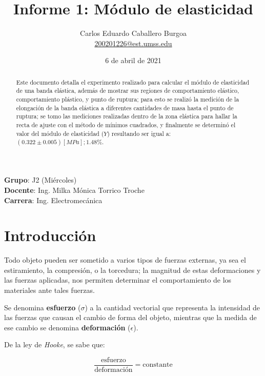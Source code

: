 \documentclass[letter,11pt]{article}
\title{Informe 1: Módulo de elasticidad}
\author{Carlos Eduardo Caballero Burgoa \\
    \small{\href{mailto:200201226@est.umss.edu}{200201226@est.umss.edu}}
}
\date{6 de abril de 2021}
\begin{document}
\maketitle
\begin{center}
    \textbf{Grupo}: J2 (Miércoles)\\
    \textbf{Docente}: Ing. Milka Mónica Torrico Troche\\
    \textbf{Carrera}: Ing. Electromecánica
\end{center}

\begin{abstract}
Este documento detalla el experimento realizado para calcular el módulo de
elasticidad de una banda elástica, además de mostrar sus regiones de
comportamiento elástico, comportamiento plástico, y punto de ruptura; para esto
se realizó la medición de la elongación de la banda elástica a diferentes
cantidades de masa hasta el punto de ruptura; se tomo las mediciones realizadas
dentro de la zona elástica para hallar la recta de ajuste con el método de
mínimos cuadrados, y finalmente se determinó el valor del módulo de elasticidad
($Y$) resultando ser igual a: $(0.322 \pm 0.005)[MPa]; 1.48\%$.
\end{abstract}

\section{Introducción}

Todo objeto pueden ser sometido a varios tipos de fuerzas externas, ya sea el
estiramiento, la compresión, o la torcedura; la magnitud de estas deformaciones
y las fuerzas aplicadas, nos permiten determinar el comportamiento de los
materiales ante tales fuerzas.

Se denomina \textbf{esfuerzo} ($\sigma$) a la cantidad vectorial que representa
la intensidad de las fuerzas que causan el cambio de forma del objeto, mientras
que la medida de ese cambio se denomina \textbf{deformación} ($\epsilon$).

De la ley de \emph{Hooke}, se sabe que:

\begin{equation}
    \frac{\text{esfuerzo}}{\text{deformación}} = \text{constante}
\label{hooke}
\end{equation}
\vspace{0.10cm}
\end{document}
